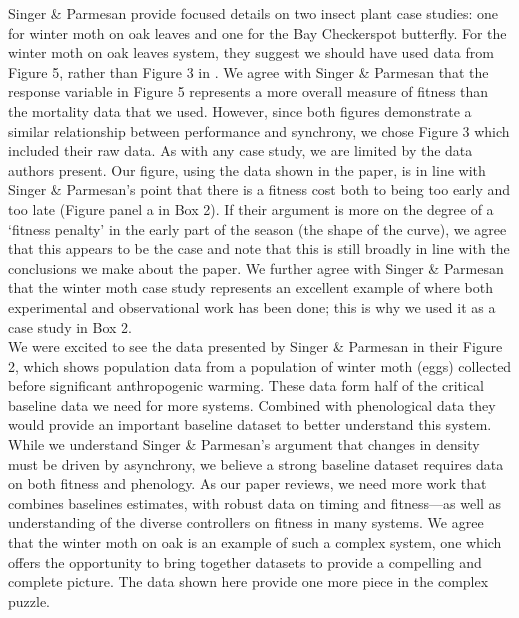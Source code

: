 \documentclass[11pt,letter]{article}
\begin{document}
Singer \& Parmesan provide focused details on two insect plant case studies: one for winter moth on oak leaves and one for the Bay Checkerspot butterfly. For the winter moth on oak leaves system, they suggest we should have used data from Figure 5, rather than Figure 3 in \citet{tikka2003}. We agree with Singer \& Parmesan that the response variable in Figure 5 represents a more overall measure of fitness than the mortality data that we used. However, since both figures demonstrate a similar relationship between performance and synchrony, we chose Figure 3 which included their raw data. As with any case study, we are limited by the data authors present. Our figure, using the data shown in the paper, is in line with Singer \& Parmesan's point that there is a fitness cost both to being too early and too late (Figure panel a in Box 2). If their argument is more on the degree of a `fitness penalty' in the early part of the season (the shape of the curve), we agree that this appears to be the case and note that this is still broadly in line with the conclusions we make about the paper. We further agree with Singer \& Parmesan that the winter moth case study represents an excellent example of where both experimental and observational work has been done; this is why we used it as a case study in Box 2. \\


We were excited to see the data presented by Singer \& Parmesan in their Figure 2, which shows population data from a population of winter moth (eggs) collected before significant anthropogenic warming. These data form half of the critical baseline data we need for more systems. Combined with phenological data they would provide an important baseline dataset to better understand this system. While we understand Singer \& Parmesan's argument that changes in density must be driven by asynchrony, we believe a strong baseline dataset requires data on both fitness and phenology. As our paper reviews, we need more work that combines baselines estimates, with robust data on timing and fitness---as well as understanding of the diverse controllers on fitness in many systems. We agree that the winter moth on oak is an example of such a complex system, one which offers the opportunity to bring together datasets to provide a compelling and complete picture. The data shown here provide one more piece in the complex puzzle. \\
\end{document}
